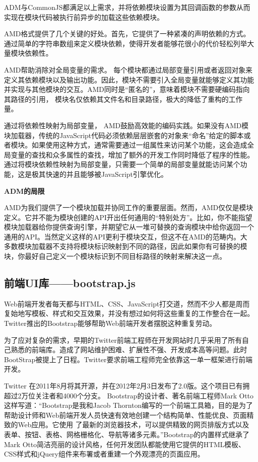 \indent
ADM与CommonJS都满足以上需求，并将依赖模块设置为其回调函数的参数从而实现在模块代码被执行前异步的加载这些依赖模块。

\indent
AMD格式提供了几个关键的好处。首先，它提供了一种紧凑的声明依赖的方式。通过简单的字符串数组来定义模块依赖，使得开发者能够花很小的代价轻松列举大量模块依赖性。

\indent
AMD帮助消除对全局变量的需求。 每个模块都通过局部变量引用或者返回对象来定义其依赖模块以及输出功能。因此，模块不需要引入全局变量就能够定义其功能并实现与其他模块的交互。AMD同时是“匿名的”，意味着模块不需要硬编码指向其路径的引用， 模块名仅依赖其文件名和目录路径，极大的降低了重构的工作量。

\indent
通过将依赖性映射为局部变量， AMD鼓励高效能的编码实践。如果没有AMD模块加载器，传统的JavaScript代码必须依赖层层嵌套的对象来“命名”给定的脚本或者模块。如果使用这种方式，通常需要通过一组属性来访问某个功能，这会造成全局变量的查找和众多属性的查找，增加了额外的开发工作同时降低了程序的性能。通过将模块依赖性映射为局部变量，只需要一个简单的局部变量就能访问某个功能，这是极其快速的并且能够被JavaScript引擎优化。

\textbf{ADM的局限}
\par
AMD为我们提供了一个模块加载并协同工作的重要层面。然而，AMD仅仅是模块定义。它并不能为模块创建的API开出任何通用的“特别处方”。比如，你不能指望模块加载器给你提供查询引擎，并期望它从一堆可替换的查询模块中给你返回一个通用的API。当然定义这样的API更利于模块交互，但这不在AMD的范畴内。大多数模块加载器不支持将模块标识映射到不同的路径，因此如果你有可替换的模块，你最好自己定义一个模块标识到不同目标路径的映射来解决这一点。

\subsection{前端UI库——bootstrap.js}

\indent
Web前端开发者每天都与HTML、CSS、JavaScript打交道，然而不少人都是周而复始地写模板、样式和交互效果，并没有想过如何将这些重复的工作整合在一起。Twitter推出的Bootstrap能够帮助Web前端开发者摆脱这种重复劳动。

\indent
为了应对复杂的需求，早期的Twitter前端工程师在开发网站时几乎采用了所有自己熟悉的前端库。造成了网站维护困难、扩展性不强、开发成本高等问题。此时BootStrap被提上了日程。Twitter要求前端工程师完全依靠这一单一框架进行前端开发。

\indent
Twitter 在2011年8月将其开源，并在2012年2月3日发布了2.0版。这个项目已有拥超过2万位关注者和4000个分支。 Bootstrap的设计者、著名前端工程师Mark Otto这样写道：“Bootstrap是我和Jacob Thornton编写的一个前端工具箱，目的是为了帮助设计师和Web前端开发人员快速有效地创建一个结构简单、性能优良、页面精致的Web应用。它使用 了最新的浏览器技术，可以提供精致的网页排版方式以及表单、按钮、表格、网格栅格化、导航等诸多元素。”Bootstrap的内置样式继承了Mark Otto简洁亮丽的设计风格，任何开发团队都能使用它提供的HTML模板、CSS样式和jQuery组件来布署或者重建一个外观漂亮的页面应用。

